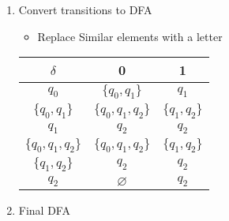 \documentclass{article}
\def \hltt{\color{BrightGreen}}
\def \indentpar#1#2{
    \begin{itemize}[leftmargin=#1,label=]
        \item #2
    \end{itemize}
}
\newlength{\ansindent}
\begin{document}
\begin{itemize}
\begin{enumerate}[label=Step \arabic* :,itemindent=\ansindent]
\begin{table}[H]
\begin{tabular}{cc}
\begin{tabular}{ccc}
							$\delta(q_1,1)$             & $=$ & $q_2$             \\
							$\delta(q_2,1)$             & $=$ & $q_2$             \\
							$\delta(\{q_0,q_1\},0)$     & $=$ & $\{q_0,q_1,q_2\}$ \\
							$\delta(\{q_0,q_1\},1)$     & $=$ & $\{q_1,q_2\}$     \\
							$\delta(\{q_1,q_2\},0)$     & $=$ & $q_2$             \\
							$\delta(\{q_1,q_2\},1)$     & $=$ & $q_2$             \\
							$\delta(\{q_0,q_2\},0)$     & $=$ & $\{q_0,q_1\}$     \\
							$\delta(\{q_0,q_2\},1)$     & $=$ & $\{q_1,q_2\}$     \\
							$\delta(\{q_0,q_1,q_2\},0)$ & $=$ & $\{q_1,q_2\}$     \\
							$\delta(\{q_0,q_1,q_2\},1)$ & $=$ & $\{q_1,q_2\}$
						\end{tabular}
					\end{tabular}
				\end{table}
			\item Convert transitions to DFA
				\indentpar{1.5em}{Replace Similar elements with a letter}
				\begin{table}[H]
					\centering
					\begin{tabular}{c|c|c}
						$\delta$          & 0                       & 1                   \\ \hline
				\hltt	$q_0$             & $\{q_0,q_1\}$           & $q_1$               \\
				\hltt	$\{q_0,q_1\}$     & $\{q_0,q_1,q_2\}$       & $\{q_1,q_2\}$       \\
				\hltt	$q_1$             & $q_2$                   & $q_2$               \\
				\hltt	$\{q_0,q_1,q_2\}$ & \hltt $\{q_0,q_1,q_2\}$ & \hltt $\{q_1,q_2\}$ \\
				\hltt	$\{q_1,q_2\}$     & \hltt $q_2$             & \hltt	$q_2$         \\
				\hltt	$q_2$             & $\varnothing$           & \hltt	$q_2$
					\end{tabular}
				\end{table}
			\item Final DFA 
		\end{enumerate} \newpage


\end{itemize}
\end{document}
